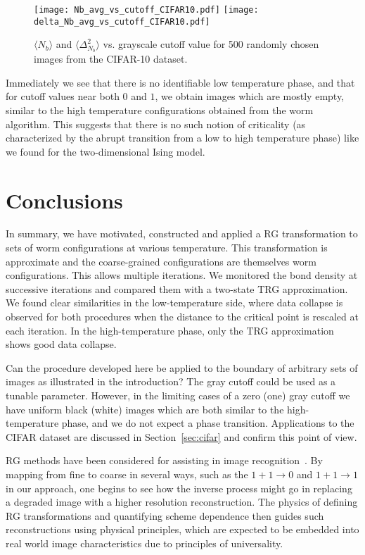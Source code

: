 \documentclass[../main.tex]{subfiles}
\begin{document}
%
\begin{figure*}[htpb]
    \centering
    \texttt{[image: Nb\_avg\_vs\_cutoff\_CIFAR10.pdf]}
    \texttt{[image: delta\_Nb\_avg\_vs\_cutoff\_CIFAR10.pdf]}
    \caption{$\langle N_b\rangle$ and $\langle \Delta_{N_b}^2\rangle$ vs.
        grayscale cutoff value for 500 randomly chosen images from the CIFAR-10
    dataset.}
    \label{fig:CIFAR10_bond_stats}
\end{figure*}
Immediately we see that there is no identifiable low temperature phase, and that for cutoff values near both $0$ and
$1$, we obtain images which are mostly empty, similar to the high temperature configurations obtained from the worm
algorithm.  This suggests that there is no such notion of criticality (as characterized by the abrupt transition from a
low to high temperature phase) like we found for the two-dimensional Ising model.

\section{Conclusions}%
In summary, we have motivated, constructed and applied a RG transformation to sets of worm configurations at various
temperature. This transformation is approximate and the coarse-grained configurations are themselves worm
configurations. This allows multiple iterations. We monitored the bond density at successive iterations and compared
them with a two-state TRG approximation.  We found clear similarities in the low-temperature side, where data collapse
is observed for both procedures when the distance to the critical point is rescaled at each iteration. In the
high-temperature phase, only the TRG approximation shows good data collapse. 

Can the procedure developed here be applied to the boundary of arbitrary sets of images as illustrated in the
introduction?  The gray cutoff could be used as a tunable parameter. However, in the limiting cases of a zero (one)
gray cutoff we have uniform black (white) images which are both similar to the high-temperature phase, and we do not
expect a phase transition.  Applications to the CIFAR dataset are discussed in Section~\ref{sec:cifar} and confirm
this point of view. 

RG methods have been considered for assisting in image recognition~\cite{16712,
0305-4470-35-37-201,1997PhLA..227..319H}. By mapping from fine to coarse in several ways, such as the $1 + 1\rightarrow
0$ and $1 + 1\rightarrow 1$ in our approach, one begins to see how the inverse process might go in replacing a degraded
image with a higher resolution reconstruction. The physics of defining RG transformations and quantifying scheme
dependence then guides such reconstructions using physical principles, which are expected to be embedded into real
world image characteristics due to principles of universality.
\end{document}
